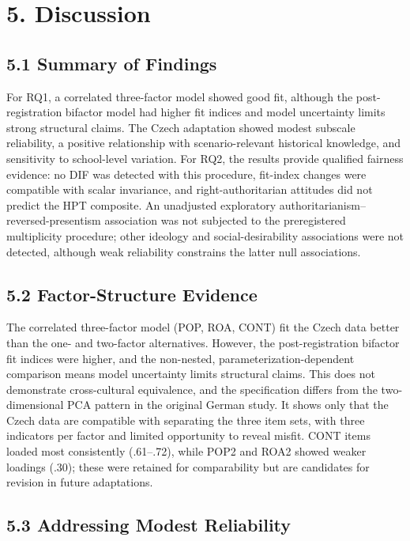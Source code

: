 \documentclass[PCJ,Unicode,screen,mode=plain]{cedram}
\begin{document}
\section*{5. Discussion}\label{discussion}

\subsection*{5.1 Summary of Findings}\label{summary-of-findings}

For RQ1, a correlated three-factor model showed good fit, although the
post-registration bifactor model had higher fit indices and model uncertainty
limits strong structural claims. The Czech adaptation showed modest subscale
reliability, a positive relationship with scenario-relevant historical
knowledge, and sensitivity to school-level variation. For RQ2, the results
provide qualified fairness evidence: no DIF was detected with this procedure,
fit-index changes were compatible with scalar invariance, and
right-authoritarian attitudes did not predict the HPT composite. An unadjusted exploratory authoritarianism--reversed-presentism association was not subjected to the preregistered multiplicity procedure; other ideology and social-desirability associations were not detected, although weak reliability constrains the latter null associations.

\subsection*{5.2 Factor-Structure Evidence}\label{factor-structure-evidence}

The correlated three-factor model (POP, ROA, CONT) fit the Czech data better
than the one- and two-factor alternatives. However, the
post-registration bifactor fit indices were higher, and the non-nested,
parameterization-dependent comparison means model uncertainty limits structural
claims. This does not demonstrate cross-cultural equivalence, and the
specification differs from the two-dimensional PCA pattern in the original
German study. It shows only that the Czech data are compatible with separating
the three item sets, with three indicators per factor and limited opportunity
to reveal misfit. CONT items loaded most consistently (.61--.72), while POP2 and
ROA2 showed weaker loadings (.30); these were retained for comparability but
are candidates for revision in future adaptations.

\subsection*{5.3 Addressing Modest Reliability}\label{addressing-modest-reliability}
\end{document}
